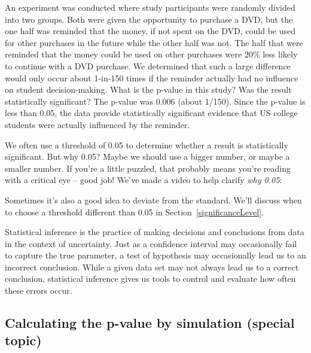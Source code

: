 \begin{example}{An experiment was conducted where study participants were randomly divided into two groups. Both were given the opportunity to purchase a DVD, but the one half was reminded that the money, if not spent on the DVD, could be used for other purchases in the future while the other half was not. The half that were reminded that the money could be used on other purchases were 20\% less likely to continue with a DVD purchase. We determined that such a large difference would only occur about 1-in-150 times if the reminder actually had no influence on student decision-making. What is the p-value in this study? Was the result statistically significant?}
The p-value was 0.006 (about 1/150). Since the p-value is less than 0.05, the data provide statistically significant evidence that US college students were actually influenced by the reminder.
\end{example}

\begin{termBox}{
We often use a threshold of 0.05 to determine whether a result is statistically significant. But why 0.05? Maybe we should use a bigger number, or maybe a smaller number. If you're a little puzzled, that probably means you're reading with a critical eye -- good job! We've made a video to help clarify \emph{why 0.05}:
\begin{center}
\end{center}
Sometimes it's also a good idea to deviate from the standard. We'll discuss when to choose a threshold different than 0.05 in Section~\ref{significanceLevel}.\vspace{0.5mm}}
\end{termBox}

Statistical inference is the practice of making decisions and conclusions from data in the context of uncertainty. Just as a confidence interval may occasionally fail to capture the true parameter, a test of hypothesis may occasionally lead us to an incorrect conclusion. While a given data set may not always lead us to a correct conclusion, statistical inference gives us tools to control and evaluate how often these errors occur.


\subsection{Calculating the p-value by simulation (special topic)}
\label{calcPValueUsingSimulationSubSection}


